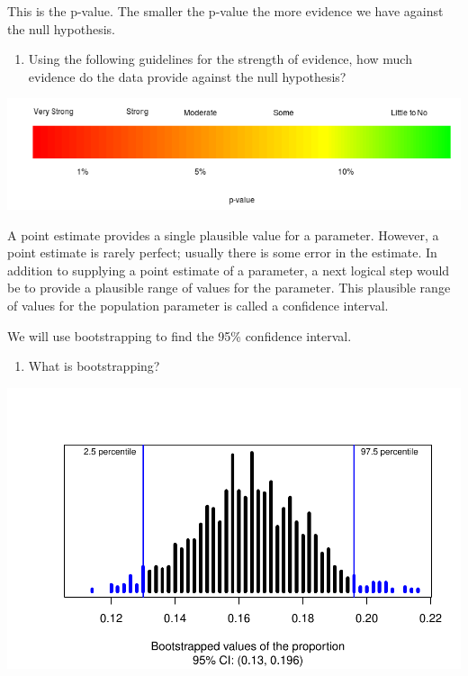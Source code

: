 \documentclass[
]{report}
\providecommand{\tightlist}{%
  \setlength{\itemsep}{0pt}\setlength{\parskip}{0pt}}
\begin{document}
\vspace{1in}

This is the p-value. The smaller the p-value the more evidence we have against the null hypothesis.

\begin{enumerate}
\def\labelenumi{\arabic{enumi}.}
\setcounter{enumi}{22}
\tightlist
\item
  Using the following guidelines for the strength of evidence, how much evidence do the data provide against the null hypothesis?
\end{enumerate}

\includegraphics{images/soe_gradient.png}
\vspace{0.5in}

A point estimate provides a single plausible value for a parameter. However, a point estimate is rarely perfect; usually there is some error in the estimate. In addition to supplying a point estimate of a parameter, a next logical step would be to provide a plausible range of values for the parameter. This plausible range of values for the population parameter is called a confidence interval.

We will use bootstrapping to find the 95\% confidence interval.

\begin{enumerate}
\def\labelenumi{\arabic{enumi}.}
\setcounter{enumi}{23}
\tightlist
\item
  What is bootstrapping?
  \vspace{1in}
\end{enumerate}

\begin{center}\includegraphics[width=0.7\linewidth]{06-inference-1cat_files/figure-latex/unnamed-chunk-6-1} \end{center}
\end{document}
